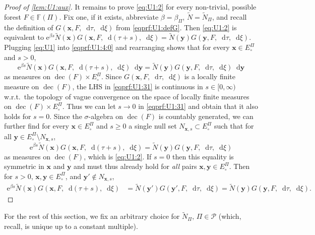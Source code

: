 \documentclass[reqno,draft]{amsart}
\numberwithin{equation}{section}
\theoremstyle{plain}
\theoremstyle{remark}
\newcommand*\diff{\mathop{}\!\mathrm{d}}
\newcommand{\e}{\mathrm{e}}
\newcommand{\fpart}{\Pi} %
\DeclareMathOperator{\dcb}{dec}
\newcommand{\nn}{\widetilde{N}} %
\newcommand{\la}{\beta} %
\begin{document}
\begin{proof}[Proof of \cref{lem:U1:aux}]
    It remains to prove \cref{eq:U1:2} for every non-trivial, possible forest $F\in \mathbb{F}(\fpart)$. Fix one, if it exists, abbreviate $\la = \la_\fpart$, $\nn = \nn_\fpart$, and recall the definition of $G(\boldsymbol x,F,\diff \tau,\diff \xi)$ from \cref{eqprf:U1:defG}. Then \cref{eq:U1:2} is equivalent to $\e^{\la s} \nn(\boldsymbol x)G(\boldsymbol x,F,\diff (\tau+s),\diff \xi) =\nn(\boldsymbol y) G(\boldsymbol y,F,\diff \tau,\diff \xi)$. Plugging \cref{eq:U1} into \cref{eqprf:U1:4:0} and rearranging shows that for every $\boldsymbol x\in E^\fpart_\circ $ and $s > 0$,
    \begin{equation}\label{eqprf:U1:31}
        \e^{\la s} \nn(\boldsymbol x)G(\boldsymbol x,F,\diff (\tau+s),\diff \xi) \diff \boldsymbol y = \nn(\boldsymbol y) G(\boldsymbol y,F,\diff \tau,\diff \xi) \diff \boldsymbol y
    \end{equation}
    as measures on $\dcb(F) \times E^\fpart_\circ$. Since $G(\boldsymbol x,F,\diff \tau,\diff \xi)$ is a locally finite measure on $\dcb(F)$, the LHS in \cref{eqprf:U1:31} is continuous in $s\in [0,\infty)$ w.r.t.\ the topology of vague convergence on the space of locally finite measures on $\dcb(F) \times E^\fpart_\circ$. %
    Thus we can let $s \to 0$ in \cref{eqprf:U1:31} and obtain that it also holds for $s = 0$. Since the $\sigma$-algebra on $\dcb(F)$ is countably generated, we can further find for every $\boldsymbol x\in E^\fpart_\circ $ and $s \ge 0$ a single null set $N_{\boldsymbol x,s}\subset E^\fpart_\circ $ such that for all $\boldsymbol y\in E^\fpart_\circ  \setminus N_{\boldsymbol x,s}$, \[
        \e^{\la s} \nn(\boldsymbol x) G(\boldsymbol x,F,\diff (\tau+s),\diff \xi) = \nn(\boldsymbol y) G(\boldsymbol y,F,\diff \tau,\diff \xi)
    \] as measures on $\dcb(F)$, which is \cref{eq:U1:2}.
    If $s = 0$ then this equality is symmetric in $\boldsymbol x$ and $\boldsymbol y$ and must thus already hold for \emph{all} pairs $\boldsymbol x,\boldsymbol y\in E^\fpart_\circ $.
    Then for $s > 0$, $\boldsymbol x,\boldsymbol y\in E^\fpart_\circ $, and $\boldsymbol y'\not\in N_{\boldsymbol x,s}$,
    \begin{align*}
        \e^{\la s} \nn(\boldsymbol x) G(\boldsymbol x,F,\diff (\tau+s),\diff \xi)
        &= \nn(\boldsymbol y') G(\boldsymbol y',F,\diff \tau,\diff \xi) = \nn(\boldsymbol y) G(\boldsymbol y,F,\diff \tau,\diff \xi).
    \end{align*}
\end{proof}
For the rest of this section, we fix an arbitrary choice for $\nn_\fpart,\, \fpart\in \mathcal{P}$ (which, recall, is unique up to a constant multiple).
\end{document}
